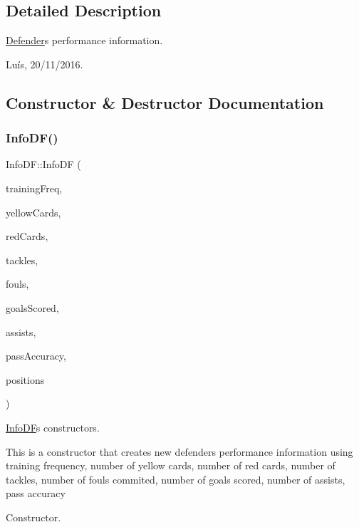 \subsection{Detailed Description}
\hyperlink{class_defender}{Defender}\textquotesingle{}s performance information. 

Luís, 20/11/2016. 

\subsection{Constructor \& Destructor Documentation}
\hypertarget{class_info_d_f_af55f2bb64e046196f749756e4d5f8112}{}\label{class_info_d_f_af55f2bb64e046196f749756e4d5f8112} 
\subsubsection{\texorpdfstring{Info\+D\+F()}{InfoDF()}\hspace{0.1cm}{\footnotesize\ttfamily [1/4]}}
{\footnotesize\ttfamily Info\+D\+F\+::\+Info\+DF (\begin{DoxyParamCaption}\item[{\hyperlink{class_fraction}{Fraction}}]{training\+Freq,  }\item[{unsigned int}]{yellow\+Cards,  }\item[{unsigned int}]{red\+Cards,  }\item[{unsigned int}]{tackles,  }\item[{unsigned int}]{fouls,  }\item[{unsigned int}]{goals\+Scored,  }\item[{unsigned int}]{assists,  }\item[{\hyperlink{class_fraction}{Fraction}}]{pass\+Accuracy,  }\item[{vector$<$ \hyperlink{_utils_8hpp_a94ee089ecd5db12c81c7edbefaabff4d}{Defender\+Position} $>$}]{positions }\end{DoxyParamCaption})}



\hyperlink{class_info_d_f}{Info\+DF}\textquotesingle{}s constructors. 

This is a constructor that creates new defender\textquotesingle{}s performance information using training frequency, number of yellow cards, number of red cards, number of tackles, number of fouls commited, number of goals scored, number of assists, pass accuracy 

Constructor. 

